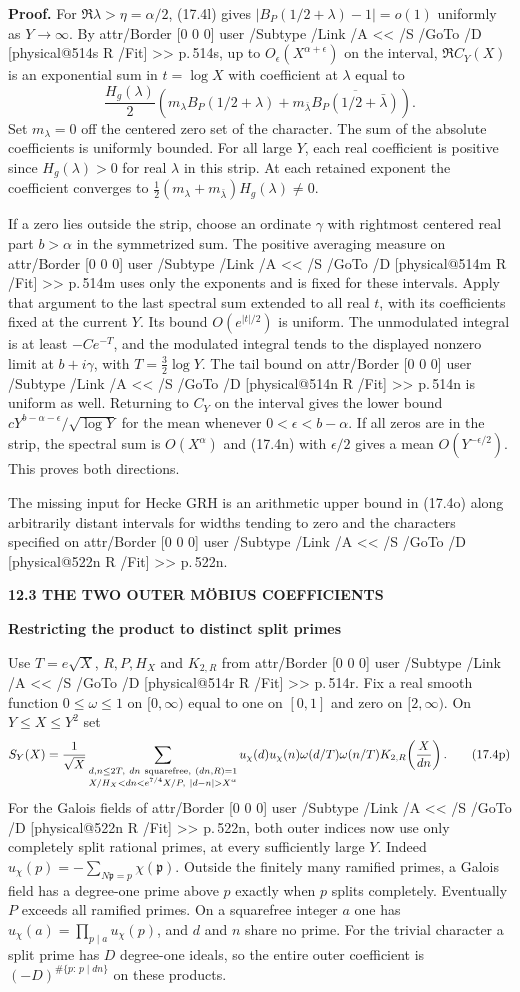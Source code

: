 \documentclass[11pt,letterpaper]{article}
\makeatletter
\newcommand{\rightmarktext}{}
\newcommand{\printfolio}{}
\newcommand{\leaf}[4]{\clearpage\gdef\printfolio{#1}\gdef\rightmarktext{#2}%
  {\small\sffamily\bfseries\color{ink}#3\par}\vspace{3pt}%
  {\LARGE\bfseries #4\par}\vspace{5pt}}
\newcommand{\point}[1]{\par\smallskip\textbf{#1.}\enspace\ignorespaces}
\newcommand{\MusicPDFPageRef}[1]{\pdfpageref\csname physical@#1\endcsname\space\space 0 R}
\newcommand{\pagelink}[2]{\leavevmode\pdfstartlink attr{/Border [0 0 0]} user{%
  /Subtype /Link /A << /S /GoTo /D [\MusicPDFPageRef{#1} /Fit] >>}%
  {\color{ink}#2}\pdfendlink}
\newcommand{\pg}[1]{\pagelink{#1}{p.\,#1}}
\makeatother
\begin{document}
\point{Proof}
For $\Re\lambda>\eta=\alpha/2$, (17.4l) gives
$|B_P(1/2+\lambda)-1|=o(1)$ uniformly as $Y\to\infty$.
By \pg{514s}, up to $O_\epsilon(X^{\alpha+\epsilon})$ on the
interval, $\Re C_Y(X)$ is an exponential sum in $t=\log X$ with
coefficient at $\lambda$ equal to
\[
 \frac{H_g(\lambda)}2\!
 \left(m_\lambda B_P(1/2+\lambda)
       +m_{\bar\lambda}\overline{B_P(1/2+\bar\lambda)}\right).
\]
Set $m_\lambda=0$ off the centered zero set of the character. The sum of the
absolute coefficients is uniformly bounded. For all large $Y$,
each real coefficient is positive since $H_g(\lambda)>0$ for real
$\lambda$ in this strip. At each retained exponent the coefficient
converges to $\tfrac12(m_\lambda+m_{\bar\lambda})H_g(\lambda)\ne0$.

If a zero lies outside the strip, choose an ordinate $\gamma$ with
rightmost centered real part $b>\alpha$ in the symmetrized sum.
The positive averaging measure on \pg{514m} uses only the exponents
and is fixed for these intervals. Apply that argument to the last
spectral sum extended to all real $t$, with its coefficients fixed
at the current $Y$. Its bound $O(e^{|t|/2})$ is uniform. The
unmodulated integral is at least $-C e^{-T}$, and the modulated
integral tends to the displayed nonzero limit at $b+i\gamma$,
with $T=\tfrac32\log Y$. The tail bound on \pg{514n} is uniform as
well. Returning to $C_Y$ on the interval gives the lower bound
$cY^{b-\alpha-\epsilon}/\sqrt{\log Y}$ for the mean whenever
$0<\epsilon<b-\alpha$. If all zeros are in the strip, the spectral
sum is $O(X^\alpha)$ and (17.4n) with $\epsilon/2$ gives a mean
$O(Y^{-\epsilon/2})$. This proves both directions.

The missing input for Hecke GRH is an arithmetic upper bound in
(17.4o) along arbitrarily distant intervals for widths tending to
zero and the characters specified on \pg{522n}.

\leaf{514u}{Squarefree products of norms}{12.3 \quad THE TWO OUTER M\"OBIUS COEFFICIENTS}{Restricting the product to distinct split primes}
Use $T=e\sqrt X$, $R,P,H_X$ and $K_{2,R}$ from \pg{514r}. Fix a real
smooth function $0\le\omega\le1$ on $[0,\infty)$ equal to one on
$[0,1]$ and zero on $[2,\infty)$. On $Y\le X\le Y^2$ set
\[
 S_Y(X)=\frac1{\sqrt X}
 \sum_{\substack{d,n\le 2T,\ dn\ {\rm squarefree},\ (dn,R)=1\\
 X/H_X<dn<e^{7/4}X/P,\ |d-n|>X^\alpha}}
 u_\chi(d)u_\chi(n)\omega(d/T)\omega(n/T)
                  K_{2,R}\!\left(\frac{X}{dn}\right).
 \tag{17.4p}
\]
For the Galois fields of \pg{522n}, both outer indices now use only
completely split rational primes, at every sufficiently large $Y$.
Indeed $u_\chi(p)=-\sum_{N\mathfrak p=p}\chi(\mathfrak p)$.
Outside the finitely many ramified primes, a Galois field has a
degree-one prime above $p$ exactly when $p$ splits completely.
Eventually $P$ exceeds all ramified primes. On a squarefree integer
$a$ one has $u_\chi(a)=\prod_{p\mid a}u_\chi(p)$, and $d$ and $n$
share no prime. For the trivial character a split prime has $D$
degree-one ideals, so the entire outer coefficient is
$(-D)^{\#\{p:\,p\mid dn\}}$ on these products.
\end{document}
